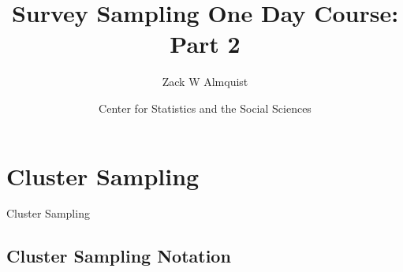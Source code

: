 \documentclass[10pt]{beamer}\usepackage[]{graphicx}\usepackage[]{xcolor}
\title[]{Survey Sampling One Day Course: Part 2}
\author[Zack W Almquist]{Zack W Almquist\\}
\institute[Department of Sociology,  \\ University of Washington ]{Department of Sociology\\
  University of Washington}
\date{Center for Statistics and the Social Sciences}
\begin{document}
{
\begin{frame}[plain]
  \titlepage
\end{frame}
}

\section[Outline]{}
\begin{frame}[allowframebreaks]{}
\vspace{.5in}
\hspace{.5in}\tableofcontents
\end{frame}




\section{Cluster Sampling}

\begin{frame}{}
\begin{block}{}
\begin{center}
Cluster Sampling
\end{center}
\end{block}
\end{frame}

\subsection{Cluster Sampling Notation}
\end{document}
